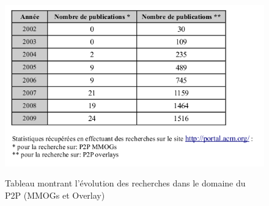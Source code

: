 	\vspace{5mm} 
        \begin{figure}[!h]
        \centering
        \includegraphics[scale=0.85]{./Ressources/Images/Stat_Rech_P2P.png}\\
        \caption{Tableau montrant l'évolution des recherches dans le domaine du P2P (MMOGs et Overlay)}
        \label{stat_P2P}
        \end{figure}
